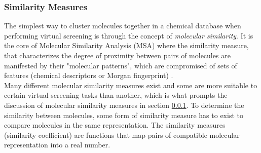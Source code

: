 \documentclass[a4paper,12pt]{report}
\begin{document}
			\subsubsection{Similarity Measures} 
			\label{subsubsection_similarity_measures}
			The simplest way to cluster molecules together in a chemical database when performing virtual screening is through the concept of \textit{molecular similarity}. It is the core of Molecular Similarity Analysis (MSA) where the similarity measure, that characterizes the degree of proximity between pairs of molecules are manifested by their "molecular patterns", which are compromised of sets of features (chemical descriptors or Morgan fingerprint) \cite{Jurgen2004}. \\
			Many different molecular similarity measures exist and some are more suitable to certain virtual screening tasks than another, which is what prompts the discussion of molecular similarity measures in section \ref{subsubsection_similarity_measures}. 
			To determine the similarity between molecules, some form of similarity measure has to exist to compare molecules in the same representation. The similarity measures (similarity coefficient) are functions that map pairs of compatible molecular representation into a real number. 
			
\end{document}
